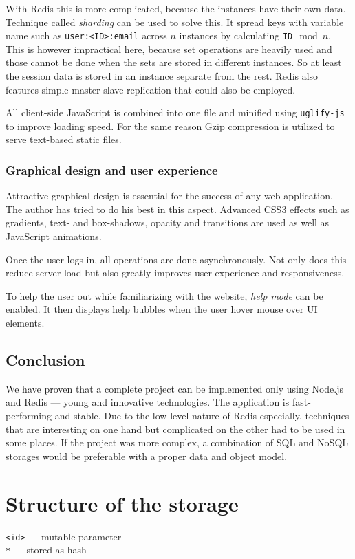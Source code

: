 \documentclass[12pt,oneside]{fithesis}
\begin{document}
		With Redis this is more complicated, because the instances have their own data. Technique called \emph{sharding} can be used to solve this. It spread keys with variable name such as \texttt{user:<ID>:email} across $n$ instances by calculating \texttt{ID}$\mod{n}$. This is however impractical here, because set operations are heavily used and those cannot be done when the sets are stored in different instances. So at least the session data is stored in an instance separate from the rest. Redis also features simple master-slave replication that could also be employed.
		
		All client-side JavaScript is combined into one file and minified using \texttt{uglify-js} to improve loading speed. For the same reason Gzip compression is utilized to serve text-based static files.
	\subsection{Graphical design and user experience}
		Attractive graphical design is essential for the success of any web application. The author has tried to do his best in this aspect. Advanced CSS3 effects such as gradients, text- and box-shadows, opacity and transitions are used as well as JavaScript animations.
		
		Once the user logs in, all operations are done asynchronously. Not only does this reduce server load but also greatly improves user experience and responsiveness.
		
		To help the user out while familiarizing with the website, \emph{help mode} can be enabled. It then displays help bubbles when the user hover mouse over UI elements.
	\section{Conclusion}
		We have proven that a complete project can be implemented only using Node.js and Redis --- young and innovative technologies. The application is fast-performing and stable. Due to the low-level nature of Redis especially, techniques that are interesting on one hand but complicated on the other had to be used in some places. If the project was more complex, a combination of SQL and NoSQL storages would be preferable with a proper data and object model.

\appendix
\chapter{Structure of the storage}
\label{appendix:scheme}
\texttt{<id>} --- mutable parameter\\
\texttt{*} --- stored as hash
\inputminted[fontsize=\footnotesize]{yaml}{scheme.txt}


\end{document}
